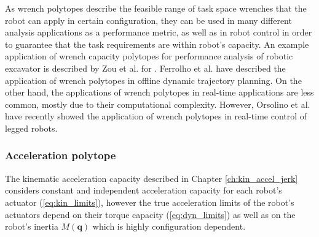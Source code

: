 As wrench polytopes describe the feasible range of task space wrenches that the robot can apply in certain configuration, they can be used in many different analysis applications as a performance metric, as well as in robot control in order to guarantee that the task requirements are within robot's capacity. An example application of wrench capacity polytopes for performance analysis of robotic excavator is described by Zou et al. for \cite{Zou2019}. Ferrolho et al. \cite{ferrolho_residual_2020} have described the application of wrench polytopes in offline dynamic trajectory planning. On the other hand, the applications of wrench polytopes in real-time applications are less common, mostly due to their computational complexity. However, Orsolino et al. \cite{Orsolino2018} have recently showed the application of wrench polytopes in real-time control of legged robots.

\subsubsection{Acceleration polytope}
\label{ch:accel_poly_robot}

The kinematic acceleration capacity described in Chapter \ref{ch:kin_accel_jerk} considers constant and independent acceleration capacity for each robot's actuator (\ref{eq:kin_limits}), however the true acceleration limits of the robot's actuators depend on their torque capacity (\ref{eq:dyn_limits}) as well as on the robot's inertia 
$M(\bm{q})$ which is highly configuration dependent. 

